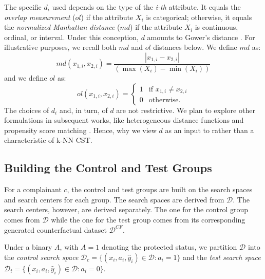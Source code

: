 The specific $d_i$ used depends on the type of the \textit{i-th} attribute.
It equals the \textit{overlap measurement} ($ol$) if the attribute $X_i$ is categorical; otherwise, it equals the \textit{normalized Manhattan distance} ($md$) if the attribute $X_i$ is continuous, ordinal, or interval.
Under this conception, $d$ amounts to Gower's distance \parencite{Gower1971}.
%
For illustrative purposes, we recall both $md$ and $ol$ distances below. We define $md$ as:
%
\begin{equation}
    md(x_{1,i}, x_{2, i}) = \frac{| x_{1,i} - x_{2, i} |}{(\max(X_i) - \min(X_i))}
\end{equation}
%
and we define $ol$ as:
%
\begin{equation}
    ol(x_{1,i}, x_{2, i}) = 
    \begin{cases}
    1 & \text{if } x_{1, i} \neq x_{2, i} \\
    0 & \text{otherwise}.
\end{cases}
\end{equation}
%
The choices of $d_i$ and, in turn, of $d$ are not restrictive.
We plan to explore other formulations in subsequent works, like heterogeneous distance functions \parencite{WilsonM97_HeteroDistanceFunctions} and propensity score matching \parencite{DBLP:journals/jiis/QureshiKKRP20}.
Hence, why we view $d$ as an input to rather than a characteristic of k-NN CST.

\subsection{Building the Control and Test Groups}
\label{sec:CST_ControlTest}
 
For a complainant $c$, the control and test groups are built on the search spaces and search centers for each group. 
The search spaces are derived from $\mathcal{D}$.
The search centers, however, are derived separately. The one for the control group comes from $\mathcal{D}$ while the one for the test group comes from its corresponding generated counterfactual dataset $\mathcal{D}^{CF}$. 

%
\begin{definition}
\label{def:SearchSpaces}
    Under a binary $A$, with $A=1$ denoting the protected status, we partition $\mathcal{D}$ into the \textit{control search space} $\mathcal{D}_c=\{(x_i, a_i, \widehat{y}_i) \in \mathcal{D}: a_i=1\}$ and the \textit{test search space} $\mathcal{D}_t=\{(x_i, a_i, \widehat{y}_i) \in \mathcal{D}: a_i=0\}$.
\end{definition}
%

